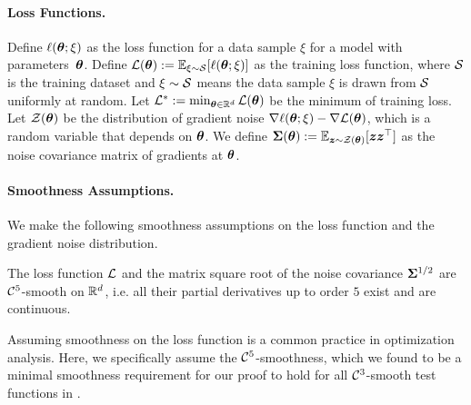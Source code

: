 \paragraph{Loss Functions.} 
Define $\ell({\bm{\theta}}; \xi)$ as the loss function for a data sample $\xi$ for a model with parameters~${\bm{\theta}}$.
Define $\mathcal{L}({\bm{\theta}}) := \mathbb{E}_{\xi \sim \mathcal{S}}[\ell({\bm{\theta}}; \xi)]$ as the training loss function, where $\mathcal{S}$ is the training dataset and $\xi \sim \mathcal{S}$ means the data sample $\xi$ is drawn from $\mathcal{S}$ uniformly at random. Let $\mathcal{L}^* := \min_{{\bm{\theta}} \in \mathbb{R}^d}\mathcal{L}({\bm{\theta}})$ be the minimum of training loss.
Let ${\mathcal{Z}}({\bm{\theta}})$ be the distribution of gradient noise $\nabla \ell({\bm{\theta}}; \xi) - \nabla \mathcal{L}({\bm{\theta}})$, which is a random variable that depends on ${\bm{\theta}}$.
We define ${\bm{\Sigma}}({\bm{\theta}}) := \mathbb{E}_{{\bm{z}} \sim {\mathcal{Z}}({\bm{\theta}})}[{\bm{z}}{\bm{z}}^\top]$ as the noise covariance matrix of gradients at ${\bm{\theta}}$.

\paragraph{Smoothness Assumptions.} 
We make the following smoothness assumptions on the loss function and the gradient noise distribution. 

\begin{assumption}\label{amp:basic}
    The loss function $\mathcal{L}$ and the matrix square root of the noise covariance ${\bm{\Sigma}}^{1/2}$ are $\mathcal{C}^5$-smooth on $\mathbb{R}^d$, i.e. all their partial derivatives  up to order $5$ exist and are continuous.
\end{assumption}

Assuming smoothness on the loss function is a common practice in optimization analysis. Here, we specifically assume the $\mathcal{C}^5$-smoothness, which we found to be a minimal smoothness requirement for our proof to hold for all $\mathcal{C}^3$-smooth test functions in .

